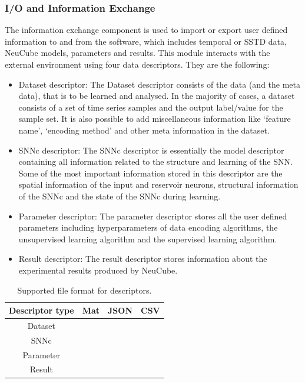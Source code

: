 \subsubsection{I/O and Information Exchange}
  
The information exchange component is used to import or export user defined information to and from the software, which includes temporal or SSTD data, NeuCube models, parameters and results. This module interacts with the external environment using four data descriptors. They are the following:

\begin{itemize}
	\item Dataset descriptor: The Dataset descriptor consists of the data (and the meta data), that is to be learned and analysed. In the majority of cases, a dataset consists of a set of time series samples and the output label/value for the sample set. It is also possible to add miscellaneous information like ‘feature name’, ‘encoding method’ and other meta information in the dataset.
	\item SNNc descriptor: The SNNc descriptor is essentially the model descriptor containing all information related to the structure and learning of the SNN. Some of the most important information stored in this descriptor are the spatial information of the input and reservoir neurons, structural information of the SNNc and the state of the SNNc during learning.
	\item Parameter descriptor: The parameter descriptor stores all the user defined parameters including hyperparameters of data encoding algorithms, the unsupervised learning algorithm and the supervised learning algorithm.
	\item Result descriptor: The result descriptor stores information about the experimental results produced by NeuCube.
\end{itemize}
 
\begin{table}
	\centering
	\caption{Supported file format for descriptors.}
	\label{tab:descriptors}
	\begin{tabular}{@{}cccc@{}}
		\toprule \toprule
		Descriptor type & Mat & JSON & CSV \\ \midrule
		
		Dataset         & \cmark & \cmark  & \cmark \\
		SNNc            & \cmark & \cmark  & \xmark  \\
		Parameter       & \cmark & \cmark  & \xmark  \\
		Result          & \cmark & \xmark   & \cmark \\
		\bottomrule \bottomrule
	\end{tabular}
\end{table}

